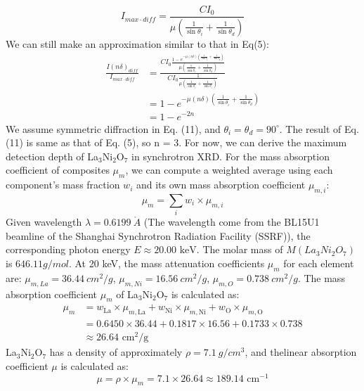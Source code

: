 \documentclass[prx,aps,twocolumn,preprintnumbers,amsmath,amssymb,superscriptaddress,showpacs]{revtex4-2}
\begin{document}
\begin{equation}
I_{max\cdot diff} = \frac{C I_0}{\mu (\frac{1}{\sin \theta_i} + \frac{1}{\sin \theta_d})}
\label{eq:einstein}
\end{equation}
We can still make an approximation similar to that in Eq(5): 
\begin{equation}
\begin{split}
\frac{I(n \delta)_{diff}}{I_{max\cdot diff}}&= \frac{C I_0 \frac{1 - e^{-\mu (n \delta) (\frac{1}{\sin \theta_i} + \frac{1}{\sin \theta_d})} }{\mu  (\frac{1}{\sin \theta_i} + \frac{1}{\sin \theta_d})}}{C I_0\frac{1}{\mu (\frac{1}{\sin \theta_i} + \frac{1}{\sin \theta_i})}}\\
&={1 - e^{-\mu (n \delta) (\frac{1}{\sin \theta_i} + \frac{1}{\sin \theta_d})} }\\
&={1 - e^{-2n  } }
\end{split}
\label{eq:einstein}
\end{equation} 
We assume symmetric diffraction in Eq. (11), and $\theta_i = \theta_d =90^\circ$. The result of  Eq. (11) is  same as that of  Eq. (5), so n = 3. For now, we can derive the maximum detection depth of La$_3$Ni$_2$O$_7$ in synchrotron XRD. For the mass absorption coefficient of composites $\mu_m$, we can compute a weighted average using each component’s mass fraction $w_i$ and its own mass absorption coefficient $\mu_{m,i}$:
\begin{equation}
\mu_m = \sum_i w_i \times \mu_{m,i}
\label{eq:einstein}
\end{equation}
Given wavelength $\lambda=0.6199\ $$\mathring{A}$  (The wavelength come from the BL15U1  beamline of the Shanghai Synchrotron Radiation Facility (SSRF)), the corresponding photon energy $E \approx 20.00 \text{ keV}$. The molar mass of $M(La_3Ni_2O_7)$ is $646.11 { g/mol}$. At 20 keV, the mass attenuation coefficients $\mu_m$ for each element \cite{xcom_nist} are:  $\mu_{m,La}=36.44\ { cm^{2}/g} $, $\mu_{m,Ni}=16.56\ { cm^{2}/g} $, $\mu_{m,O}=0.738\ { cm^{2}/g} $. The mass absorption coefficient  $\mu_m$ of La$_3$Ni$_2$O$_7$ is calculated as: 
\begin{equation}
\begin{split}
\mu_m &= w_{\text{La}} \times \mu_{m,\text{La}} + w_{\text{Ni}} \times \mu_{m,\text{Ni}} + w_{\text{O}} \times \mu_{m,\text{O}} \\
&= 0.6450 \times 36.44 + 0.1817 \times 16.56 + 0.1733 \times 0.738 \\
&\approx 26.64 \text{ cm}^2/\text{g}
\end{split}
\label{eq:einstein}
\end{equation}
La$_3$Ni$_2$O$_7$ has a density of approximately $\rho= 7.1\ {g/ cm^{3}}$, and thelinear absorption coefficient $\mu$  is calculated as:
\begin{equation}
\mu = \rho \times \mu_m = 7.1 \times 26.64 \approx 189.14 \text{ cm}^{-1}
\label{eq:einstein}
\end{equation}
\end{document}
